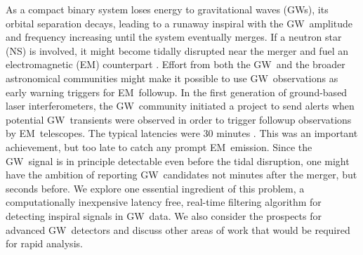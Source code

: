 \documentclass[preprint2]{aastex}
\newcommand{\NS}{NS}
\newcommand{\GW}{GW}%
\newcommand{\EM}{EM}%
\begin{document}
As a compact binary system loses energy to gravitational waves (\GW{}s), its
orbital separation decays, leading to a runaway inspiral with the \GW\
amplitude and frequency increasing until the system eventually merges.  If a
neutron star (\NS) is involved, it might become tidally disrupted near the
merger and fuel an electromagnetic (\EM) counterpart \citep{shibata:2007}.
Effort from both the \GW\ and the broader astronomical communities might make
it possible to use \GW\ observations as early warning triggers for \EM\
followup. In the first generation of ground-based laser interferometers, the
\GW\ community initiated a project to send alerts when potential \GW\
transients were observed in order to trigger followup observations by \EM\
telescopes.  The typical latencies were 30 minutes \citep{HugheyGWPAW2011}.
This was an important achievement, but too late to catch any prompt \EM\
emission.  Since the \GW\ signal is in principle detectable even before the tidal
disruption, one might have the ambition of reporting \GW\ candidates not minutes
after the merger, but seconds before.  We explore one essential ingredient of
this problem, a computationally inexpensive latency free, real-time filtering
algorithm for detecting inspiral signals in \GW\ data.  We also consider the
prospects for advanced \GW\ detectors and discuss other areas of work that would
be required for rapid analysis.
\end{document}
